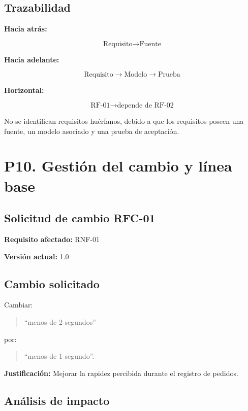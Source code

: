 \documentclass[12pt]{article}
\begin{document}
\subsection*{Trazabilidad}

\textbf{Hacia atrás:}

\[
\text{Requisito} \rightarrow \text{Fuente}
\]

\textbf{Hacia adelante:}

\[
\text{Requisito} \rightarrow \text{Modelo} \rightarrow \text{Prueba}
\]

\textbf{Horizontal:}

\[
\text{RF-01} \rightarrow \text{depende de RF-02}
\]

No se identifican requisitos huérfanos, debido a que los requisitos
poseen una fuente, un modelo asociado y una prueba de aceptación.


\section*{P10. Gestión del cambio y línea base}

\subsection*{Solicitud de cambio RFC-01}

\textbf{Requisito afectado:} RNF-01

\textbf{Versión actual:} 1.0

\subsection*{Cambio solicitado}

Cambiar:

\begin{quote}
``menos de 2 segundos''
\end{quote}

por:

\begin{quote}
``menos de 1 segundo''.
\end{quote}

\textbf{Justificación:} Mejorar la rapidez percibida durante el
registro de pedidos.

\subsection*{Análisis de impacto}
\end{document}
